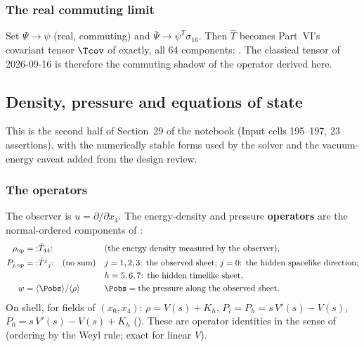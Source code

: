 \subsubsection{The real commuting limit}
\label{sec:3.6.6}

Set $\Psi\to\psi$ (real, commuting) and $\bar\Psi\to\psi^{T}\sigma_{16}$. Then $\hat T$ becomes
Part~VI's covariant tensor $\Tcov$ of  exactly, all 64 components:
. The classical tensor of 2026-09-16 is therefore the commuting shadow of the
operator derived here.

\subsection{Density, pressure and equations of state}
\label{sec:3.7}

This is the second half of Section~29 of the notebook (Input cells 195--197, 23 assertions), with the
numerically stable forms used by the solver and the vacuum-energy caveat added from the design
review.

\subsubsection{The operators}
\label{sec:3.7.1}

The observer is $u=\partial/\partial x_4$. The energy-density and pressure \textbf{operators} are the
normal-ordered components of :
\begin{align*}
  \rho_{\mathrm{op}}&={:}\hat T_{44}{:} &&\text{(the energy density measured by the observer)},\\
  P_{j,\mathrm{op}}&={:}\hat T^j{}_j{:}\quad(\text{no sum}) &&j=1,2,3\text{: the observed sheet; } j=0\text{: the hidden spacelike direction;}\\
  & &&h=5,6,7\text{: the hidden timelike sheet},\\
  w&=\langle\Pobs\rangle/\langle\rho\rangle &&\Pobs=\text{the pressure along the observed sheet}.
\end{align*}
On shell, for fields of $(x_0,x_4)$: $\rho=V(s)+K_h$, $P_i=P_h=s\,V'(s)-V(s)$,
$P_0=s\,V'(s)-V(s)+K_h$ (). These are operator identities in the sense of
 (ordering by the Weyl rule; exact for linear $V$).

